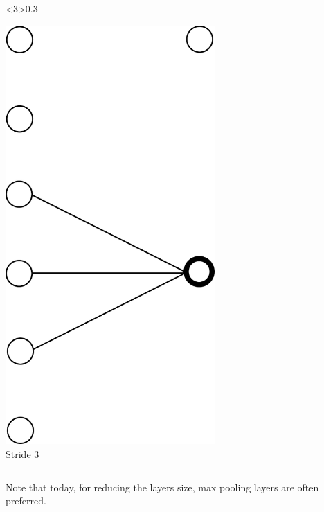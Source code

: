 \documentclass[xcolor=pdftex,dvipsnames,table,mathserif]{beamer}
\begin{document}
{\begin{columns}
  \begin{column}<3>{0.3\textwidth}
    \begin{center}
      \includegraphics[width=0.60\textwidth]{stride3.png}
      \\Stride 3
    \end{center}
  \end{column}

\end{columns}

\begin{block}{}
  Note that today, for reducing the layers size, max pooling layers are often preferred.
  \end{block}


}

\end{document}
